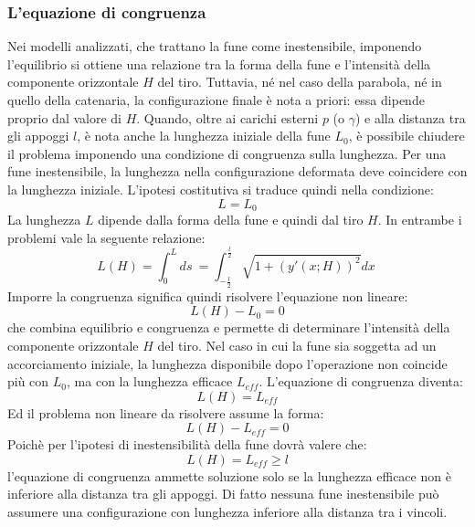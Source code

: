 \subsubsection{L'equazione di congruenza}
Nei modelli analizzati, che trattano la fune come inestensibile, imponendo l'equilibrio si ottiene una relazione tra la forma della fune e l'intensità della componente orizzontale $H$ del tiro. Tuttavia, né nel caso della parabola, né in quello della catenaria, la configurazione finale è nota a priori: essa dipende proprio dal valore di $H$.
Quando, oltre ai carichi esterni $p$ (o $\gamma$) e alla distanza tra gli appoggi $l$, è nota anche la lunghezza iniziale della fune $L_0$, è possibile chiudere il problema imponendo una condizione di congruenza sulla lunghezza.
Per una fune inestensibile, la lunghezza nella configurazione deformata deve coincidere con la lunghezza iniziale. L'ipotesi costitutiva si traduce quindi nella condizione:
\begin{equation}
   L = L_0
   \label{eq:congruenza_inestensibile}
\end{equation}
La lunghezza $L$ dipende dalla forma della fune e quindi dal tiro $H$. In entrambe i problemi vale la seguente relazione: 
\begin{equation}
 L(H) = \int_{0}^{L} ds\ = \int_{-\frac{l}{2}}^{\frac{l}{2}} \sqrt{1 + (y'(x; H))^{2}} dx\
 \label{eq:lunghezza_deformata}
\end{equation}
Imporre la congruenza significa quindi risolvere l'equazione non lineare: 
\begin{equation}
   L(H) - L_0 = 0
   \label{eq:congruenza_inestensibile2}
\end{equation}
che combina equilibrio e congruenza e permette di determinare l'intensità della componente orizzontale $H$ del tiro. 
Nel caso in cui la fune sia soggetta ad un accorciamento iniziale, la lunghezza disponibile dopo l'operazione non coincide più con $L_0$, ma con la lunghezza efficace $L_{eff}$. L'equazione di congruenza diventa: 
\begin{equation}
   L(H) = L_{eff}
   \label{eq:congruenza_inestensibile_con accorciamento}
\end{equation}
Ed il problema non lineare da risolvere assume la forma:
\begin{equation}
   L(H) - L_{eff} = 0
   \label{eq:congruenza_inestensibile2_con_accorciamento}
\end{equation}
Poichè per l'ipotesi di inestensibilità della fune dovrà valere che: 
\begin{equation}
   L(H) = L_{eff} \geq l
   \label{eq:condizione_di_esistenza_della_soluzione}
\end{equation}
l'equazione di congruenza ammette soluzione solo se la lunghezza efficace non è inferiore alla distanza tra gli appoggi. Di fatto nessuna fune inestensibile può assumere una configurazione con lunghezza inferiore alla distanza tra i vincoli. 

